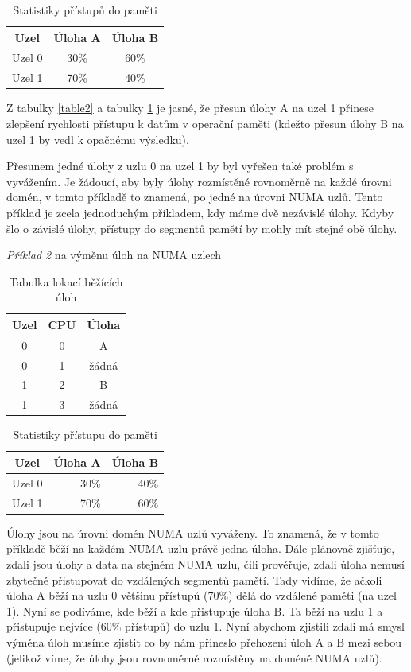 \documentclass[
  master=true,
  font=sans,
  printversion=false,
  joinlists=true,
  figures=true,
  tables=true,
  sourcecodes=false,
  theorems=false,
  bibencoding=utf8,
  language=czech,
  encoding=utf8,
  field=ainfk,
  biblatex,
  glossaries,
  index
]{kidiplom}
\begin{document}
\begin{table}[h]
\centering
\begin{tabular}{|c|c|c|}
\hline
Uzel & Úloha A & Úloha B \\
\hline
Uzel 0 & 30\% & 60\% \\
\hline
Uzel 1 & 70\% & 40\% \\
\hline
\end{tabular}
\caption{Statistiky přístupů do paměti}
\label{table3}
\end{table}

Z tabulky \ref{table2} a tabulky \ref{table3} je jasné, že přesun úlohy A na uzel 1 přinese zlepšení rychlosti přístupu k datům v operační paměti (kdežto přesun úlohy B na uzel 1 by vedl k opačnému výsledku).

Přesunem jedné úlohy z uzlu 0 na uzel 1 by byl vyřešen také problém s vyvážením. Je žádoucí, aby byly úlohy rozmístěné rovnoměrně na každé úrovni domén, v tomto příkladě to znamená, po jedné na úrovni NUMA uzlů. Tento příklad je zcela jednoduchým příkladem, kdy máme dvě nezávislé úlohy. Kdyby šlo o závislé úlohy, přístupy do segmentů pamětí by mohly mít stejné obě úlohy.

\newpage
\noindent
\textit{Příklad 2} na výměnu úloh na NUMA uzlech

\begin{table}[h]
\centering
\begin{tabular}{|c|c|c|}
\hline
Uzel & CPU & Úloha \\
\hline
0 & 0 & A \\
\hline
0 & 1 & žádná  \\
\hline
1 & 2 & B \\
\hline
1 & 3 & žádná \\
\hline
\end{tabular}
\caption{Tabulka lokací běžících úloh}
\label{table4}
\end{table}

\begin{table}[h]
\centering
\begin{tabular}{|c|r|r|}
\hline
Uzel & Úloha A & Úloha B \\
\hline
Uzel 0 & 30\% & 40\% \\
\hline
Uzel 1 & 70\% & 60\% \\
\hline
\end{tabular}
\caption{Statistiky přístupu do paměti}
\label{table5}
\end{table}

Úlohy jsou na úrovni domén NUMA uzlů vyváženy. To znamená, že v tomto příkladě běží na každém NUMA uzlu právě jedna úloha. Dále plánovač zjišťuje, zdali jsou úlohy a data na stejném NUMA uzlu, čili prověřuje, zdali úloha nemusí zbytečně přistupovat do vzdálených segmentů pamětí.  Tady vidíme, že ačkoli úloha A běží na uzlu 0 většinu přístupů (70\%) dělá do vzdálené paměti (na uzel 1). Nyní se podíváme, kde běží a kde přistupuje úloha B. Ta běží na uzlu 1 a přistupuje nejvíce (60\% přístupů) do uzlu 1. Nyní abychom zjistili zdali má smysl výměna úloh musíme zjistit co by nám přineslo přehození úloh A a B mezi sebou (jelikož víme, že úlohy jsou rovnoměrně rozmístěny na doméně NUMA uzlů).
\end{document}
